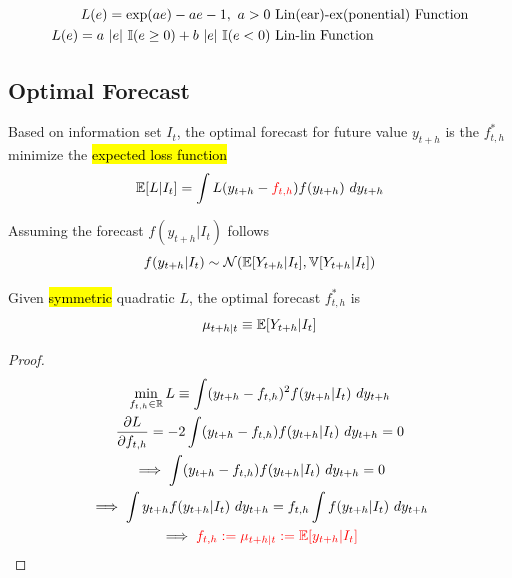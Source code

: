 \documentclass[11pt]{article}
\begin{document}
		\begin{example}[Asymmetric Loss Functions with $\mc{E} = \R$]
			\begin{align}
				L(e) = \exp(ae) - ae - 1,\ a > 0 & \tx{ Lin(ear)-ex(ponential) Function} \\
				L(e) = a\ |e|\ \mathbb{I}(e \geq 0) + b\ |e|\ \mathbb{I}(e < 0) &\tx{ Lin-lin Function}
			\end{align}
		\end{example}
		
	\subsection{Optimal Forecast}
		\begin{definition}
			Based on information set $I_t$, the optimal forecast for future value $y_{t+h}$ is the $f^*_{t,h}$ minimize the \hl{expected loss function}
			\begin{equation}
				\mathbb{E}[{L|I_t}] = \int L(y_{t+h} - \textcolor{red}{f_{t,h}}) f(y_{t+h})\ dy_{t+h}
			\end{equation}
		\end{definition}
		
		\begin{assumption}
			Assuming the forecast $f(y_{t+h}|I_t)$ follows
			\begin{equation}
				f(y_{t+h}|I_t) \sim \mathcal{{N}}(\mathbb{E}[{Y_{t+h}|I_t}], \mathbb{V}[{Y_{t+h}|I_t}])
			\end{equation}
		\end{assumption}
		
		\begin{proposition}
			Given \hl{symmetric} quadratic $L$, the optimal forecast $f^*_{t,h}$ is 
			\begin{equation}
				\mu_{t+h|t} \equiv \mathbb{E}[{Y_{t+h}|I_t}]
			\end{equation}
			\begin{proof}
				\begin{gather}
					\min_{f_{t, h} \in \R} L \equiv \int (y_{t+h} - f_{t, h})^2 f(y_{t+h}|I_t)\ dy_{t+h} \\
					\pd{L}{f_{t, h}} = -2 \int (y_{t+h} - f_{t, h}) f(y_{t+h}|I_t)\ dy_{t+h} = 0 \\
					\implies \int (y_{t+h} - f_{t, h}) f(y_{t+h}|I_t)\ dy_{t+h} = 0 \\
					\implies \int y_{t+h} f(y_{t+h}|I_t)\ dy_{t+h} = f_{t, h} \int  f(y_{t+h}|I_t)\ dy_{t+h} \\
					\implies \red{f_{t, h} := \mu_{t+h|t} := \expect{y_{t+h}|I_t}}
				\end{gather}
			\end{proof}
		\end{proposition}
		
\end{document}
